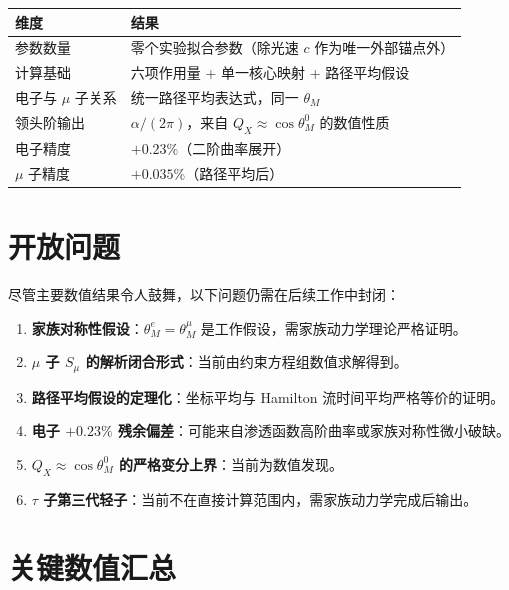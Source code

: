 \documentclass[12pt,a4paper]{article}
\theoremstyle{definition}
\begin{document}
\begin{center}
\begin{tabular}{@{}lp{8cm}@{}}
\toprule
维度 & 结果 \\
\midrule
参数数量 & 零个实验拟合参数（除光速 $c$ 作为唯一外部锚点外） \\
计算基础 & 六项作用量 + 单一核心映射 + 路径平均假设 \\
电子与 $\mu$ 子关系 & 统一路径平均表达式，同一 $\theta_M$ \\
领头阶输出 & $\alpha/(2\pi)$，来自 $Q_X\approx\cos\theta_M^0$ 的数值性质 \\
电子精度 & $+0.23\%$（二阶曲率展开） \\
$\mu$ 子精度 & $+0.035\%$（路径平均后） \\
\bottomrule
\end{tabular}
\end{center}

\section{开放问题}

尽管主要数值结果令人鼓舞，以下问题仍需在后续工作中封闭：

\begin{enumerate}
\item \textbf{家族对称性假设}：$\theta_M^e=\theta_M^\mu$ 是工作假设，需家族动力学理论严格证明。
\item \textbf{$\mu$ 子 $S_\mu$ 的解析闭合形式}：当前由约束方程组数值求解得到。
\item \textbf{路径平均假设的定理化}：坐标平均与 Hamilton 流时间平均严格等价的证明。
\item \textbf{电子 $+0.23\%$ 残余偏差}：可能来自渗透函数高阶曲率或家族对称性微小破缺。
\item \textbf{$Q_X\approx\cos\theta_M^0$ 的严格变分上界}：当前为数值发现。
\item \textbf{$\tau$ 子第三代轻子}：当前不在直接计算范围内，需家族动力学完成后输出。
\end{enumerate}

\appendix

\section{关键数值汇总}
\end{document}
